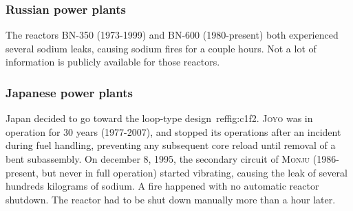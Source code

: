 \subsubsection{Russian power plants}
\label{subsubsec1:russia}

The reactors \textsc{BN-350} (1973-1999) and \textsc{BN-600} (1980-present) both experienced several sodium leaks, causing sodium fires for a couple hours. Not a lot of information is publicly available for those reactors.



\subsubsection{Japanese power plants}
\label{subsubsec1:japan}

Japan decided to go toward the loop-type design~ref{fig:c1f2}. \textsc{Joyo} was in operation for 30 years (1977-2007), and stopped its operations after an incident during fuel handling, preventing any subsequent core reload until removal of a bent subassembly.
On december 8, 1995, the secondary circuit of \textsc{Monju} (1986-present, but never in full operation) started vibrating, causing the leak of several hundreds kilograms of sodium. A fire happened with no automatic reactor shutdown. The reactor had to be shut down manually more than a hour later.



